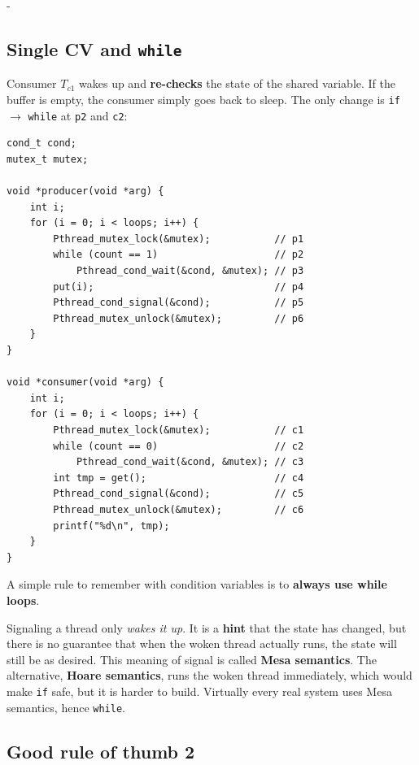 \documentclass[11pt,a4paper]{article}
\makeatletter
\newcommand{\keepspace}[1]{\par\penalty-100\begingroup
  \setlength{\dimen@}{#1}\dimen@ii\pagegoal\advance\dimen@ii-\pagetotal
  \ifdim\dimen@>\dimen@ii\ifdim\dimen@ii>\z@\vfil\fi\break\fi\endgroup}
\newcommand{\Tc}[1]{\(T_{c#1}\)}
\makeatother
\begin{document}
\keepspace{30\baselineskip}
\subsection{Single CV and \texttt{while}}

Consumer \Tc1 wakes up and \textbf{re-checks} the state of the shared
variable. If the buffer is empty, the consumer simply goes back to sleep.
The only change is \texttt{if} \(\to\) \texttt{while} at \texttt{p2} and
\texttt{c2}:

\begin{lstlisting}
cond_t cond;
mutex_t mutex;

void *producer(void *arg) {
    int i;
    for (i = 0; i < loops; i++) {
        Pthread_mutex_lock(&mutex);           // p1
        while (count == 1)                    // p2
            Pthread_cond_wait(&cond, &mutex); // p3
        put(i);                               // p4
        Pthread_cond_signal(&cond);           // p5
        Pthread_mutex_unlock(&mutex);         // p6
    }
}

void *consumer(void *arg) {
    int i;
    for (i = 0; i < loops; i++) {
        Pthread_mutex_lock(&mutex);           // c1
        while (count == 0)                    // c2
            Pthread_cond_wait(&cond, &mutex); // c3
        int tmp = get();                      // c4
        Pthread_cond_signal(&cond);           // c5
        Pthread_mutex_unlock(&mutex);         // c6
        printf("%d\n", tmp);
    }
}
\end{lstlisting}

A simple rule to remember with condition variables is to \textbf{always use
while loops}.

\begin{keybox}
Signaling a thread only \emph{wakes it up}. It is a \textbf{hint} that the
state has changed, but there is no guarantee that when the woken thread
actually runs, the state will still be as desired. This meaning of signal is
called \textbf{Mesa semantics}. The alternative, \textbf{Hoare semantics},
runs the woken thread immediately, which would make \texttt{if} safe, but it
is harder to build. Virtually every real system uses Mesa semantics, hence
\texttt{while}.
\end{keybox}

\subsection{Good rule of thumb 2}
\end{document}
